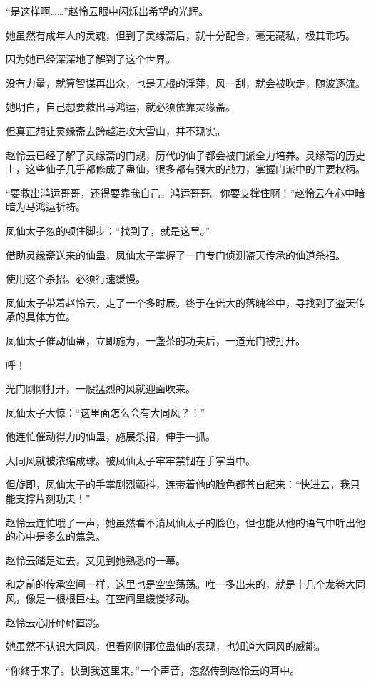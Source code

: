 \begin{this_body}
“是这样啊……”赵怜云眼中闪烁出希望的光辉。

她虽然有成年人的灵魂，但到了灵缘斋后，就十分配合，毫无藏私，极其乖巧。

因为她已经深深地了解到了这个世界。

没有力量，就算智谋再出众，也是无根的浮萍，风一刮，就会被吹走，随波逐流。

她明白，自己想要救出马鸿运，就必须依靠灵缘斋。

但真正想让灵缘斋去跨越进攻大雪山，并不现实。

赵怜云已经了解了灵缘斋的门规，历代的仙子都会被门派全力培养。灵缘斋的历史上，这些仙子几乎都修成了蛊仙，很多都有强大的战力，掌握门派中的主要权柄。

“要救出鸿运哥哥，还得要靠我自己。鸿运哥哥。你要支撑住啊！”赵怜云在心中暗暗为马鸿运祈祷。

凤仙太子忽的顿住脚步：“找到了，就是这里。”

借助灵缘斋送来的仙蛊，凤仙太子掌握了一门专门侦测盗天传承的仙道杀招。

使用这个杀招。必须行速缓慢。

凤仙太子带着赵怜云，走了一个多时辰。终于在偌大的落魄谷中，寻找到了盗天传承的具体方位。

凤仙太子催动仙蛊，立即施为，一盏茶的功夫后，一道光门被打开。

呼！

光门刚刚打开，一股猛烈的风就迎面吹来。

凤仙太子大惊：“这里面怎么会有大同风？！”

他连忙催动得力的仙蛊，施展杀招，伸手一抓。

大同风就被浓缩成球。被凤仙太子牢牢禁锢在手掌当中。

但旋即，凤仙太子的手掌剧烈颤抖，连带着他的脸色都苍白起来：“快进去，我只能支撑片刻功夫！”

赵怜云连忙哦了一声，她虽然看不清凤仙太子的脸色，但也能从他的语气中听出他的心中是多么的焦急。

赵怜云踏足进去，又见到她熟悉的一幕。

和之前的传承空间一样，这里也是空空荡荡。唯一多出来的，就是十几个龙卷大同风，像是一根根巨柱。在空间里缓慢移动。

赵怜云心肝砰砰直跳。

她虽然不认识大同风，但看刚刚那位蛊仙的表现，也知道大同风的威能。

“你终于来了。快到我这里来。”一个声音，忽然传到赵怜云的耳中。


\end{this_body}
